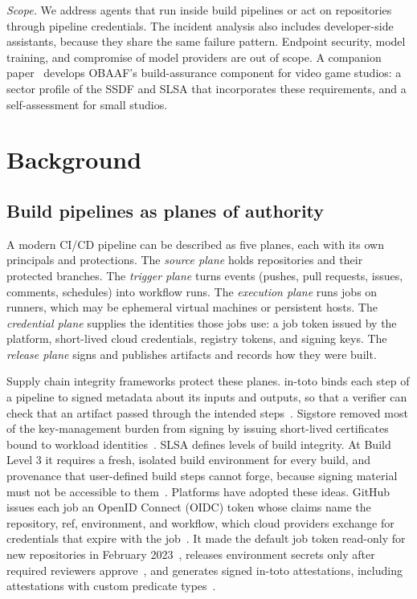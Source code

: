 \documentclass[acmsmall,screen,review]{acmart}
\begin{document}
\emph{Scope.} We address agents that run inside build pipelines or act on repositories through pipeline credentials. The incident analysis also includes developer-side assistants, because they share the same failure pattern. Endpoint security, model training, and compromise of model providers are out of scope. A companion paper~\cite{keluoudeke2026securing} develops OBAAF's build-assurance component for video game studios: a sector profile of the SSDF and SLSA that incorporates these requirements, and a self-assessment for small studios.


\section{Background}\label{sec:2}


\subsection{Build pipelines as planes of authority}\label{sec:2.1}

A modern CI/CD pipeline can be described as five planes, each with its own principals and protections. The \emph{source plane} holds repositories and their protected branches. The \emph{trigger plane} turns events (pushes, pull requests, issues, comments, schedules) into workflow runs. The \emph{execution plane} runs jobs on runners, which may be ephemeral virtual machines or persistent hosts. The \emph{credential plane} supplies the identities those jobs use: a job token issued by the platform, short-lived cloud credentials, registry tokens, and signing keys. The \emph{release plane} signs and publishes artifacts and records how they were built.

Supply chain integrity frameworks protect these planes. in-toto binds each step of a pipeline to signed metadata about its inputs and outputs, so that a verifier can check that an artifact passed through the intended steps~\cite{torresarias2019toto}. Sigstore removed most of the key-management burden from signing by issuing short-lived certificates bound to workload identities~\cite{newman2022sigstore}. SLSA defines levels of build integrity. At Build Level 3 it requires a fresh, isolated build environment for every build, and provenance that user-defined build steps cannot forge, because signing material must not be accessible to them~\cite{openndslsa}. Platforms have adopted these ideas. GitHub issues each job an OpenID Connect (OIDC) token whose claims name the repository, ref, environment, and workflow, which cloud providers exchange for credentials that expire with the job~\cite{githubndopenid}. It made the default job token read-only for new repositories in February 2023~\cite{github2023github}, releases environment secrets only after required reviewers approve~\cite{githubnddeployments}, and generates signed in-toto attestations, including attestations with custom predicate types~\cite{githubndactions}.
\end{document}

